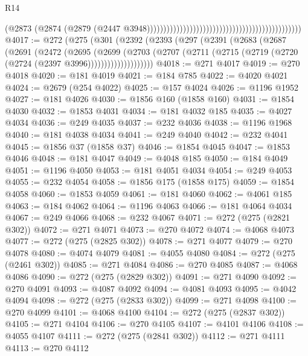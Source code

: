 \begin{lexlean}{R14}
\begin{coremodule}
                                                                                          (@2873
                                                                                            (@2874
                                                                                              (@2879
                                                                                                (@2447
                                                                                                  @3948)))))))))))))))))))))))))))))))))))))))))))))))
@4017 := @272
    (@275
      (@301
        (@2392
          (@2393
            (@297
              (@2391
                (@2683
                  (@2687
                    (@2691
                      (@2472
                        (@2695
                          (@2699
                            (@2703
                              (@2707
                                (@2711 (@2715 (@2719 (@2720 (@2724 (@2397 @3996))))))))))))))))))))
@4018 := @271 @4017
@4019 := @270 @4018
@4020 := @181 @4019
@4021 := @184 @785
@4022 := @4020 @4021
@4024 := @2679 (@254 @4022)
@4025 := @157 @4024
@4026 := @1196 @1952
@4027 := @181 @4026
@4030 := @1856 @160 (@1858 @160)
@4031 := @1854 @4030
@4032 := @1853 @4031
@4034 := @181 @4032 @185
@4035 := @4027 @4034
@4036 := @249 @4035
@4037 := @232 @4036
@4038 := @1196 @1968
@4040 := @181 @4038 @4034
@4041 := @249 @4040
@4042 := @232 @4041
@4045 := @1856 @37 (@1858 @37)
@4046 := @1854 @4045
@4047 := @1853 @4046
@4048 := @181 @4047
@4049 := @4048 @185
@4050 := @184 @4049
@4051 := @1196 @4050
@4053 := @181 @4051 @4034
@4054 := @249 @4053
@4055 := @232 @4054
@4058 := @1856 @175 (@1858 @175)
@4059 := @1854 @4058
@4060 := @1853 @4059
@4061 := @181 @4060
@4062 := @4061 @185
@4063 := @184 @4062
@4064 := @1196 @4063
@4066 := @181 @4064 @4034
@4067 := @249 @4066
@4068 := @232 @4067
@4071 := @272 (@275 (@2821 @302))
@4072 := @271 @4071
@4073 := @270 @4072
@4074 := @4068 @4073
@4077 := @272 (@275 (@2825 @302))
@4078 := @271 @4077
@4079 := @270 @4078
@4080 := @4074 @4079
@4081 := @4055 @4080
@4084 := @272 (@275 (@2461 @302))
@4085 := @271 @4084
@4086 := @270 @4085
@4087 := @4068 @4086
@4090 := @272 (@275 (@2829 @302))
@4091 := @271 @4090
@4092 := @270 @4091
@4093 := @4087 @4092
@4094 := @4081 @4093
@4095 := @4042 @4094
@4098 := @272 (@275 (@2833 @302))
@4099 := @271 @4098
@4100 := @270 @4099
@4101 := @4068 @4100
@4104 := @272 (@275 (@2837 @302))
@4105 := @271 @4104
@4106 := @270 @4105
@4107 := @4101 @4106
@4108 := @4055 @4107
@4111 := @272 (@275 (@2841 @302))
@4112 := @271 @4111
@4113 := @270 @4112

\end{coremodule}
\end{lexlean}

